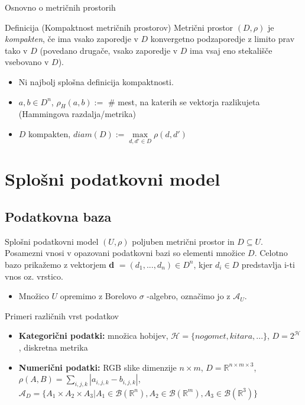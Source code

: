 \documentclass{beamer}
\begin{document}
\begin{frame}{Osnovno o metričnih prostorih}
\begin{block}{Definicija (Kompaktnost metričnih prostorov)} 
Metrični prostor $(D, \rho)$ je \textit{kompakten}, če ima vsako zaporedje v $D$ konvergetno podzaporedje z limito prav tako v $D$ (povedano drugače, vsako zaporedje v $D$ ima vsaj eno stekališče vsebovano v $D$).
\end{block}
\begin{itemize}
\item Ni najbolj splošna definicija kompaktnosti.
\item  $a, b \in D^n$, $\rho_H(a,b) :=$ \# mest, na katerih se vektorja razlikujeta (Hammingova razdalja/metrika)
\item $D$ kompakten, $diam(D) := \max\limits_{d,d' \in D}\rho(d,d')$
\end{itemize}
\end{frame}


\section{Splošni podatkovni model}

\subsection{Podatkovna baza}
\begin{frame}{Splošni podatkovni model}
$(U, \rho)$ poljuben metrični prostor in $D \subseteq U$. Posamezni vnosi v opazovani podatkovni bazi so elementi množice $D$. Celotno bazo prikažemo z vektorjem \textbf{d} $= (d_{1}, ..., d_{n}) \in D^n$, kjer $d_{i} \in D$ predstavlja i-ti vnos oz. vrstico.
\newline
\newline
\begin{itemize}
\item Množico $U$ opremimo z Borelovo $\sigma$ -algebro, označimo jo z $\mathcal{A}_{U}$. 
\end{itemize}
\end{frame}


\begin{frame}{Primeri različnih vrst podatkov}
\begin{itemize}
\item \textbf{Kategorični podatki:} množica hobijev, $\mathcal{H}=\{nogomet, kitara,...\}$, $D = 2^\mathcal{H}$, diskretna metrika
\item \textbf{Numerični podatki:} RGB slike dimenzije $n \times m$, $D = \mathbb{R}^{n\times m \times 3}$, $\rho(A,B)=\sum_{i,j,k}  |a_{i,j,k}-b_{i,j,k}|$,  $\mathcal{A}_{D}=\{A_{1} \times A_{2} \times A_{3} | A_{1} \in \mathcal{B}(\mathbb{R}^n),  A_{2} \in \mathcal{B}(\mathbb{R}^m),  A_{3} \in \mathcal{B}(\mathbb{R}^3) \}$
\end{itemize}
\end{frame}
\end{document}
